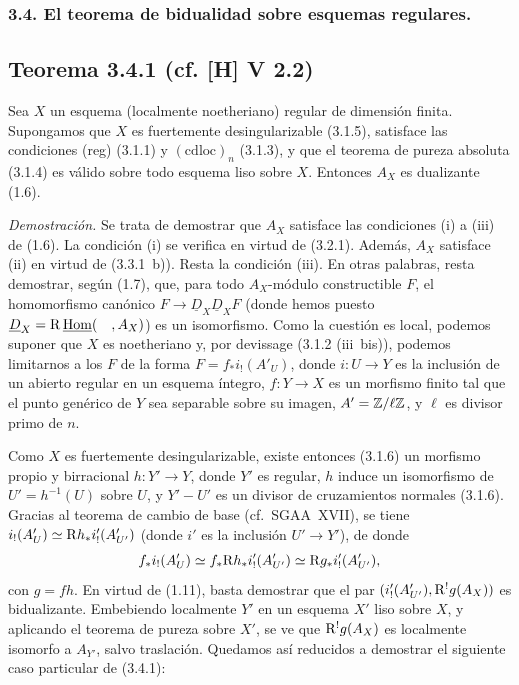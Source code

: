 \subsubsection*{3.4. El teorema de bidualidad sobre esquemas regulares.}

\subsection*{Teorema 3.4.1 (cf. [H] V 2.2)}
Sea $X$ un esquema (localmente noetheriano) regular de dimensión finita. Supongamos que $X$ es fuertemente desingularizable (3.1.5), satisface las condiciones (reg) (3.1.1) y $(\mathrm{cdloc})_n$ (3.1.3), y que el teorema de pureza absoluta (3.1.4) es válido sobre todo esquema liso sobre $X$. Entonces $A_X$ es dualizante (1.6).

\emph{Demostración.} Se trata de demostrar que $A_X$ satisface las condiciones (i) a (iii) de (1.6). La condición (i) se verifica en virtud de (3.2.1). Además, $A_X$ satisface (ii) en virtud de (3.3.1~b)). Resta la condición (iii). En otras palabras, resta demostrar, según (1.7), que, para todo $A_X$-módulo constructible $F$, el homomorfismo canónico $F \to \underline{D}_X \underline{D}_X F$ (donde hemos puesto $\underline{D}_X = \mathrm{R}\,\underline{\operatorname{Hom}}(\quad, A_X)$) es un isomorfismo. Como la cuestión es local, podemos suponer que $X$ es noetheriano y, por devissage (3.1.2 (iii~bis)), podemos limitarnos a los $F$ de la forma $F = f_{*}i_{!}(A'_U)$, donde $i : U \to Y$ es la inclusión de un abierto regular en un esquema íntegro, $f : Y \to X$ es un morfismo finito tal que el punto genérico de $Y$ sea separable sobre su imagen, $A' = \mathbb{Z}/\ell\mathbb{Z}$, y $\ell$ es divisor primo de $n$.

Como $X$ es fuertemente desingularizable, existe entonces (3.1.6) un morfismo propio y birracional $h : Y' \to Y$, donde $Y'$ es regular, $h$ induce un isomorfismo de $U' = h^{-1}(U)$ sobre $U$, y $Y' - U'$ es un divisor de cruzamientos normales (3.1.6). Gracias al teorema de cambio de base (cf.~SGAA~XVII), se tiene $i_{!}(A'_U) \simeq \mathrm{R} h_{*} i'_{!}(A'_{U'})$ (donde $i'$ es la inclusión $U' \to Y'$), de donde
\[
f_{*} i_{!}(A'_U) \simeq f_{*} \mathrm{R} h_{*} i'_{!}(A'_{U'}) \simeq \mathrm{R} g_{*} i'_{!}(A'_{U'}),
\]
con $g = fh$. En virtud de (1.11), basta demostrar que el par $(i'_{!}(A'_{U'}), \mathrm{R}^{!}g(A_X))$ es bidualizante. Embebiendo localmente $Y'$ en un esquema $X'$ liso sobre $X$, y aplicando el teorema de pureza sobre $X'$, se ve que $\mathrm{R}^{!}g(A_X)$ es localmente isomorfo a $A_{Y'}$, salvo traslación. Quedamos así reducidos a demostrar el siguiente caso particular de (3.4.1):

